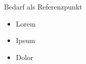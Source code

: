 \documentclass[xcolor=table,9pt,aspectratio=169]{beamer}
\begin{document}
\begin{frame}{\vspace*{10mm}Bedarf als Referenzpunkt}
\begin{multicols}{2}
\begin{itemize}
   \item Lorem
   \item Ipsum
   \item Dolor
\end{itemize}
\vfill

\begin{center}
   \vspace{1cm}
   \vspace{1cm}
\end{center}
\end{multicols}
\end{frame}
\end{document}
